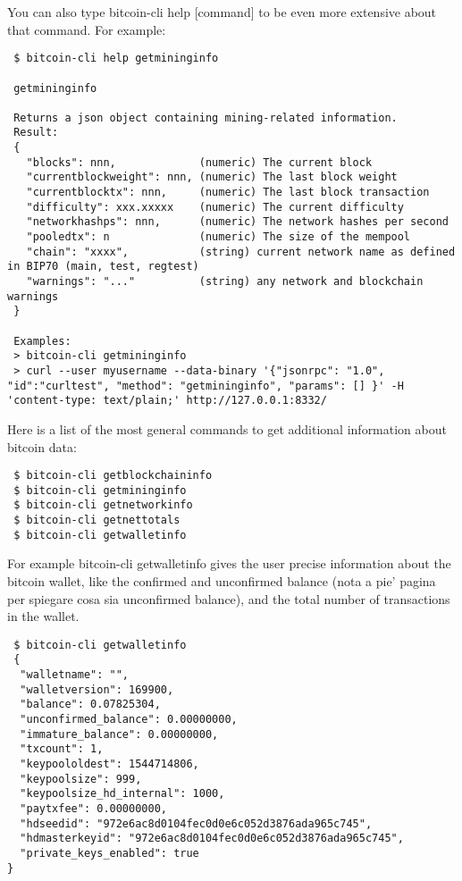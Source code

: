 \bigskip
\noindent
You can also type \colorbox{Grey!10}{bitcoin-cli help [command]} to be even more extensive about that command. For example:
\bigskip
\begin{lstlisting}
 $ bitcoin-cli help getmininginfo
 
 getmininginfo

 Returns a json object containing mining-related information.
 Result:
 {
   "blocks": nnn,             (numeric) The current block
   "currentblockweight": nnn, (numeric) The last block weight
   "currentblocktx": nnn,     (numeric) The last block transaction
   "difficulty": xxx.xxxxx    (numeric) The current difficulty
   "networkhashps": nnn,      (numeric) The network hashes per second
   "pooledtx": n              (numeric) The size of the mempool
   "chain": "xxxx",           (string) current network name as defined in BIP70 (main, test, regtest)
   "warnings": "..."          (string) any network and blockchain warnings
 }

 Examples:
 > bitcoin-cli getmininginfo 
 > curl --user myusername --data-binary '{"jsonrpc": "1.0", "id":"curltest", "method": "getmininginfo", "params": [] }' -H 'content-type: text/plain;' http://127.0.0.1:8332/
\end{lstlisting}
\bigskip
\noindent
Here is a list of the most general commands to get additional information about bitcoin data:
\bigskip
\begin{lstlisting}
 $ bitcoin-cli getblockchaininfo
 $ bitcoin-cli getmininginfo
 $ bitcoin-cli getnetworkinfo
 $ bitcoin-cli getnettotals
 $ bitcoin-cli getwalletinfo
\end{lstlisting}
\bigskip
\noindent
For example \colorbox{Grey!10}{bitcoin-cli getwalletinfo} gives the user precise information about the bitcoin wallet, like the confirmed and unconfirmed balance (nota a pie' pagina per spiegare cosa sia unconfirmed balance), and the total number of transactions in the wallet.
\bigskip
\begin{lstlisting}
 $ bitcoin-cli getwalletinfo
 {
  "walletname": "",
  "walletversion": 169900,
  "balance": 0.07825304,
  "unconfirmed_balance": 0.00000000,
  "immature_balance": 0.00000000,
  "txcount": 1,
  "keypoololdest": 1544714806,
  "keypoolsize": 999,
  "keypoolsize_hd_internal": 1000,
  "paytxfee": 0.00000000,
  "hdseedid": "972e6ac8d0104fec0d0e6c052d3876ada965c745",
  "hdmasterkeyid": "972e6ac8d0104fec0d0e6c052d3876ada965c745",
  "private_keys_enabled": true
}
\end{lstlisting}


